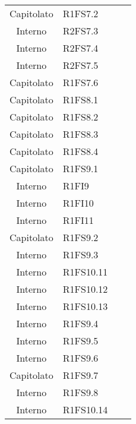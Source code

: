 {\begin{longtable}{ c C{4cm} c c}
Capitolato & R1FS7.2\\

Interno & R2FS7.3\\

Interno & R2FS7.4\\

Interno & R2FS7.5\\

Capitolato & R1FS7.6\\

Capitolato & R1FS8.1\\


Capitolato & R1FS8.2\\

Capitolato & R1FS8.3\\

Capitolato & R1FS8.4\\

Capitolato & R1FS9.1\\

Interno & R1FI9\\

Interno & R1FI10\\

Interno & R1FI11\\

Capitolato & R1FS9.2\\


Interno & R1FS9.3\\

Interno & R1FS10.11\\

Interno & R1FS10.12\\

Interno & R1FS10.13\\

Interno & R1FS9.4\\

Interno & R1FS9.5\\

Interno & R1FS9.6\\

Capitolato & R1FS9.7\\

Interno & R1FS9.8\\


Interno & R1FS10.14\\


\end{longtable}}

